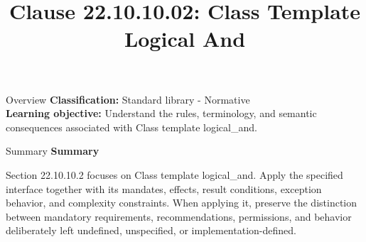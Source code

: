 \documentclass[10pt,letterpaper]{article}
\title{Clause 22.10.10.02: Class Template Logical And}
\author{}
\date{}
\begin{document}
\maketitle
\begin{CornellOverviewBox}{Overview}
\textbf{Classification:} Standard library - Normative\\[2pt]
\textbf{Learning objective:} Understand the rules, terminology, and semantic consequences associated with Class template logical\_and.
\end{CornellOverviewBox}\begin{CornellSummaryBox}{Summary}
{\sffamily\bfseries\color{Accent} Summary}\par\vspace{3pt}Section 22.10.10.2 focuses on Class template logical\_and. Apply the specified interface together with its mandates, effects, result conditions, exception behavior, and complexity constraints. When applying it, preserve the distinction between mandatory requirements, recommendations, permissions, and behavior deliberately left undefined, unspecified, or implementation-defined.
\end{CornellSummaryBox}
\end{document}
